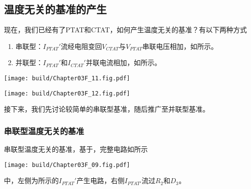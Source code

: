 \subsection{温度无关的基准的产生}
现在，我们已经有了PTAT和CTAT，如何产生温度无关的基准？有以下两种方式
\begin{enumerate}
    \item 串联型：$I_{PTAT}'$流经电阻变回$V_{CTAT}$与$V_{PTAT}$串联电压相加，如所示。
    \item 并联型：$I_{PTAT}'$和$I_{CTAT}'$并联电流相加，如所示。
\end{enumerate}
\begin{Figure}[温度无关的基准的两种构成方式]
    \begin{FigureSub}[串联型]
        \texttt{[image: build/Chapter03F\_11.fig.pdf]}
    \end{FigureSub}
    \qquad
    \begin{FigureSub}[并联型]
        \texttt{[image: build/Chapter03F\_12.fig.pdf]}
    \end{FigureSub}
\end{Figure}
接下来，我们先讨论较简单的串联型基准，随后推广至并联型基准。

\subsubsection{串联型温度无关的基准}
串联型温度无关的基准，基于，完整电路如所示
\begin{Figure}[串联型温度无关的基准]
    \texttt{[image: build/Chapter03F\_09.fig.pdf]}
\end{Figure}
中，左侧为所示的$I_{PTAT}'$产生电路，右侧$I_{PTAT'}$流过$R_2$和$D_3$。

